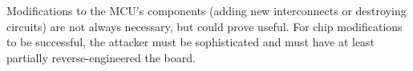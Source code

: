 	Modifications to the MCU's components (adding new interconnects or destroying circuits) are not always necessary, but could prove useful\citep{anderson:tamper_resistance}. For chip modifications to be successful, the attacker must be sophisticated and must have at least partially reverse-engineered the board.
